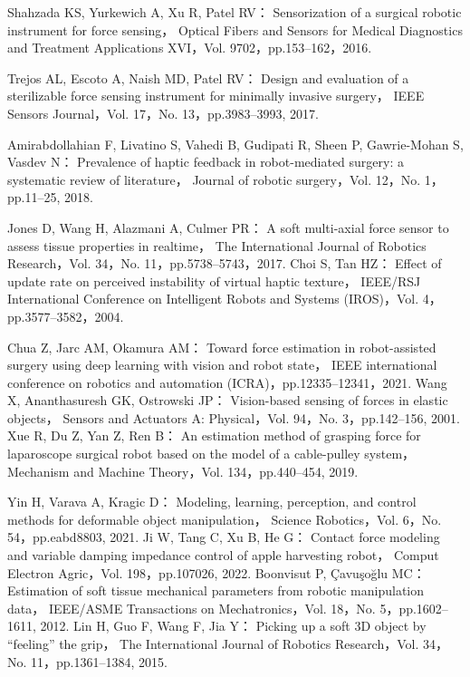 \documentclass[a4paper]{jarticle}
\begin{document}
\begin{thebibliography}{9}
    Shahzada KS, Yurkewich A, Xu R, Patel RV：
    Sensorization of a surgical robotic instrument for force sensing，
    Optical Fibers and Sensors for Medical Diagnostics and Treatment Applications XVI，Vol. 9702，pp.153–162，2016.
    
    Trejos AL, Escoto A, Naish MD, Patel RV：
    Design and evaluation of a sterilizable force sensing instrument for minimally invasive surgery，
    IEEE Sensors Journal，Vol. 17，No. 13，pp.3983–3993, 2017.

    Amirabdollahian F, Livatino S, Vahedi B, Gudipati R, Sheen P, Gawrie-Mohan S, Vasdev N：
    Prevalence of haptic feedback in robot-mediated surgery: a systematic review of literature，
    Journal of robotic surgery，Vol. 12，No. 1，pp.11–25, 2018.





    Jones D, Wang H, Alazmani A, Culmer PR：
    A soft multi-axial force sensor to assess tissue properties in realtime，
    The International Journal of Robotics Research，Vol. 34，No. 11，pp.5738–5743，2017.
    Choi S, Tan HZ：
    Effect of update rate on perceived instability of virtual haptic texture，
    IEEE/RSJ International Conference on Intelligent Robots and Systems (IROS)，Vol. 4，pp.3577–3582，2004.

    Chua Z, Jarc AM, Okamura AM：
    Toward force estimation in robot-assisted surgery using deep learning with vision and robot state，
    IEEE international conference on robotics and automation (ICRA)，pp.12335–12341，2021.
    Wang X, Ananthasuresh GK, Ostrowski JP：
    Vision-based sensing of forces in elastic objects，
    Sensors and Actuators A: Physical，Vol. 94，No. 3，pp.142–156, 2001.
    Xue R, Du Z, Yan Z, Ren B：
    An estimation method of grasping force for laparoscope surgical robot based on the model of a cable-pulley system，
    Mechanism and Machine Theory，Vol. 134，pp.440–454, 2019.


    Yin H, Varava A, Kragic D：
    Modeling, learning, perception, and control methods for deformable object manipulation，
    Science Robotics，Vol. 6，No. 54，pp.eabd8803, 2021.
    Ji W, Tang C, Xu B, He G：
    Contact force modeling and variable damping impedance control of apple harvesting robot，
    Comput Electron Agric，Vol. 198，pp.107026, 2022.
    Boonvisut P, Çavuşoğlu MC：
    Estimation of soft tissue mechanical parameters from robotic manipulation data，
    IEEE/ASME Transactions on Mechatronics，Vol. 18，No. 5，pp.1602–1611, 2012.
    Lin H, Guo F, Wang F, Jia Y：
    Picking up a soft 3D object by “feeling” the grip，
    The International Journal of Robotics Research，Vol. 34，No. 11，pp.1361–1384, 2015.


\end{thebibliography}
\end{document}
